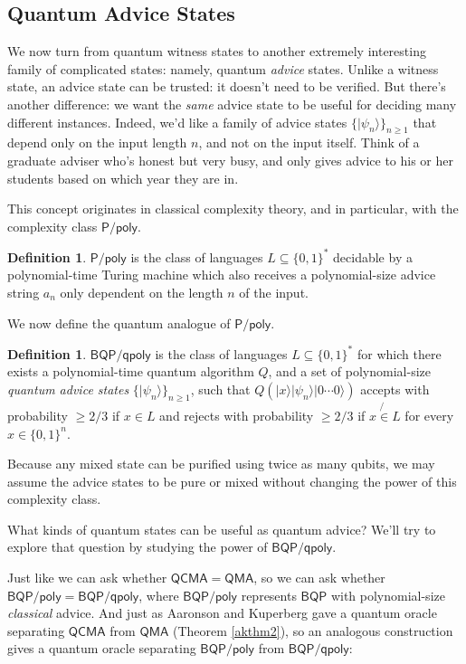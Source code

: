 \documentclass[12pt]{report}
\theoremstyle{plain}
\theoremstyle{definition}
\newtheorem{definition}[theorem]{Definition}
\renewcommand{\ket}[1]{|#1\rangle}
\begin{document}
\subsection{Quantum Advice States}

We now turn from quantum witness states to another extremely interesting family of complicated states: namely, quantum {\em advice} states.  Unlike a witness state, an advice state can
be trusted: it doesn't need to be verified.  But there's another difference: we want the {\em same} advice state to be useful for deciding many different instances.  Indeed, we'd like
a family of advice states $\{ \ket{\psi_n} \}_{n \geq 1}$ that depend only on the input length $n$, and not on the input itself.  Think of a graduate adviser who's honest but very busy, and only gives advice to his or her students based on which year they are in.

This concept originates in classical complexity theory, and in particular, with the complexity class $\mathsf{P/poly}$.

\begin{definition}
  $\mathsf{P/poly}$ is the class of languages $L\subseteq \{0,1\}^*$ decidable by a polynomial-time Turing machine
  which also receives a polynomial-size advice string $a_n$ only dependent on the length $n$ of the input.
\end{definition}

We now define the quantum analogue of $\mathsf{P/poly}$.

\begin{definition}
  $\mathsf{BQP/qpoly}$ is the class of languages $L \subseteq \{ 0, 1 \}^*$ for which
  there exists a polynomial-time quantum algorithm $Q$, and a set of polynomial-size
  {\em quantum advice states} $\{ \ket{\psi_n} \}_{n\geq 1}$, such that
  $Q ( \ket{ x } \ket{ \psi_n} \ket{ 0 \cdots 0})$ accepts with probability $\geqslant 2 / 3$ if $x \in L$ and
  rejects with probability $\geqslant 2 / 3$ if $x \not{\in} L$ for every $x
  \in \{ 0, 1 \}^n$.
\end{definition}

Because any mixed state can be purified using twice as many qubits, we may assume the advice states to be pure or mixed without changing the power of this complexity class.

What kinds of quantum states can be useful as quantum advice?  We'll try to explore that question by studying the power of $\mathsf{BQP/qpoly}$.

Just like we can ask whether $\mathsf{QCMA}=\mathsf{QMA}$, so we can ask whether $\mathsf{BQP/poly}=\mathsf{BQP/qpoly}$, where $\mathsf{BQP/poly}$ represents
$\mathsf{BQP}$ with polynomial-size {\em classical} advice.  And just as Aaronson and Kuperberg \cite{ak} gave a quantum oracle separating $\mathsf{QCMA}$ from $\mathsf{QMA}$
(Theorem \ref{akthm2}), so an analogous construction gives a quantum oracle separating $\mathsf{BQP/poly}$ from $\mathsf{BQP/qpoly}$:
\end{document}
